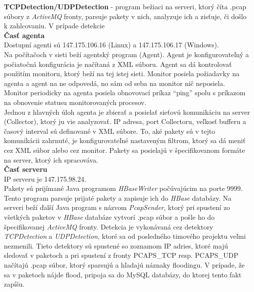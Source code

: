 \documentclass[a4paper,12pt]{article}
\begin{document}
\noindent \textbf{TCPDetection/UDPDetection} - program bežiaci na serveri, ktorý číta .pcap súbory z \textit{ActiveMQ} fronty, parsuje pakety v nich, analyzuje ich a zisťuje, či došlo k zahlcovaniu. V prípade detekcie \\

\noindent \textbf{Časť agenta} \\
Dostupní agenti sú 147.175.106.16 (Linux) a 147.175.106.17 (Windows). \\

Na počítačoch v sieti beží agentský program (Agent). Agent je konfigurovateľný a počiatočná konfigurácia je načítaná z XML súboru. Agent sa dá kontrolovať použitím monitoru, ktorý beží  na tej istej sieti. Monitor posiela požiadavky na agenta a agent na ne odpovedá, no sám od seba na monitor nič neposiela. Monitor periodicky na agenta posiela obnovovací príkaz “ping” spolu s príkazom na obnovenie statusu monitorovaných procesov. \\

Jednou z hlavných úloh agenta je zbierať a posielať sieťovú komunikáciu na server (Collector), ktorý ju vie analyzovať. IP adresa, port Collectoru, veľkosť bufferu a časový interval sú definované v XML súbore. To, aké pakety sú v tejto komunikácii zahrnuté, je konfigurovateľné nastaveným filtrom, ktorý sa dá meniť cez XML súbor alebo cez monitor. Pakety sa posielajú v špecifikovanom formáte na server, ktorý ich spracováva. \\

\noindent \textbf{Časť serveru} \\
IP serveru je 147.175.98.24. \\

Pakety sú prijímané Java programom \textit{HBaseWriter} počúvajúcim na porte 9999. Tento program parsuje prijaté pakety a zapisuje ich do \textit{HBase} databázy.  Na serveri beží ďalší Java program s názvom \textit{PcapSender}, ktorý pri spustení zo všetkých paketov v \textit{HBase} databáze vytvorí .pcap súbor a pošle ho do špecifikovanej \textit{ActiveMQ} fronty. Detekcia je vykonávaná cez detektory \textit{TCPDetection} a \textit{UDPDetection}, ktoré sa od posledného timového projektu veľmi nezmenili. Tieto detektory sú spustené so zoznamom IP adries, ktoré majú sledovať v paketoch a pri spustení z fronty PCAPS\_TCP resp. PCAPS\_UDP načítajú .pcap súbor, ktorý sparsujú a hľadajú náznaky floodingu. V prípade, že sa v paketoch nájde flood, pripoja sa do MySQL databázy, do ktorej tento fakt zapíšu. \\
\newpage
\end{document}

